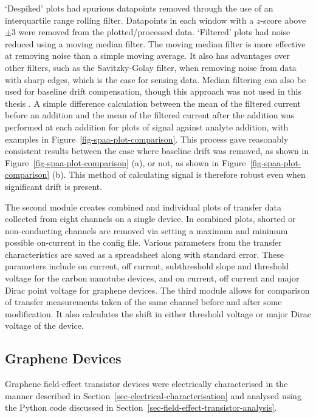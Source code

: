 \documentclass[
  a4paper,
]{scrbook}
\begin{document}
`Despiked' plots had spurious datapoints removed through the use of an
interquartile range rolling filter. Datapoints in each window with a
\(z\)-score above \(\pm 3\) were removed from the plotted/processed
data. `Filtered' plots had noise reduced using a moving median filter.
The moving median filter is more effective at removing noise than a
simple moving average. It also has advantages over other filters, such
as the Savitzky-Golay filter, when removing noise from data with sharp
edges, which is the case for sensing data. Median filtering can also be
used for baseline drift compensation, though this approach was not used
in this thesis \autocite{Stone2011}. A simple difference calculation
between the mean of the filtered current before an addition and the mean
of the filtered current after the addition was performed at each
addition for plots of signal against analyte addition, with examples in
Figure~\ref{fig-spaa-plot-comparison}. This process gave reasonably
consistent results between the case where baseline drift was removed, as
shown in Figure~\ref{fig-spaa-plot-comparison} (a), or not, as shown in
Figure~\ref{fig-spaa-plot-comparison} (b). This method of calculating
signal is therefore robust even when significant drift is present.

The second module creates combined and individual plots of transfer data
collected from eight channels on a single device. In combined plots,
shorted or non-conducting channels are removed via setting a maximum and
minimum possible on-current in the config file. Various parameters from
the transfer characteristics are saved as a spreadsheet along with
standard error. These parameters include on current, off current,
subthreshold slope and threshold voltage for the carbon nanotube
devices, and on current, off current and major Dirac point voltage for
graphene devices. The third module allows for comparison of transfer
measurements taken of the same channel before and after some
modification. It also calculates the shift in either threshold voltage
or major Dirac voltage of the device.

\hypertarget{graphene-devices}{%
\subsection{Graphene Devices}\label{graphene-devices}}

Graphene field-effect transistor devices were electrically characterised
in the manner described in Section~\ref{sec-electrical-characterisation}
and analysed using the Python code discussed in
Section~\ref{sec-field-effect-transistor-analysis}.
\end{document}
